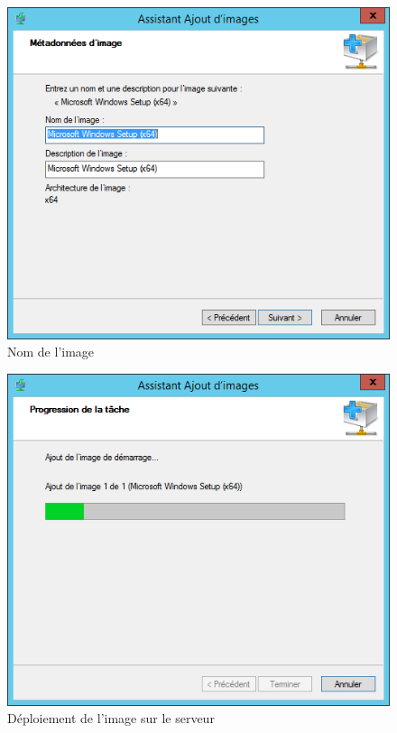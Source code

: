 \documentclass[11pt,a4paper,oneside]{article}
\begin{document}
\begin{figure}[hbtp]
\centering
\includegraphics[scale=0.7]{Pictures/Configuration/Conf10.png}
\caption{\label{etiquette} Nom de l'image}
\end{figure}
\begin{figure}[hbtp]
\centering
\includegraphics[scale=0.7]{Pictures/Configuration/Conf11.png}
\caption{\label{etiquette} Déploiement de l'image sur le serveur}
\end{figure}
\newpage
\end{document}
